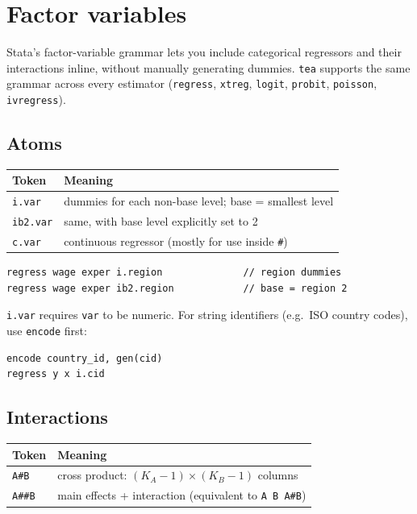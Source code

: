\documentclass[11pt,letterpaper]{article}
\begin{document}
\section{Factor variables}\label{sec:factor}

Stata's factor-variable grammar lets you include categorical regressors
and their interactions inline, without manually generating dummies.
\texttt{tea} supports the same grammar across every estimator
(\texttt{regress}, \texttt{xtreg}, \texttt{logit}, \texttt{probit},
\texttt{poisson}, \texttt{ivregress}).

\subsection{Atoms}

\begin{center}
\begin{tabular}{ll}
\toprule
Token & Meaning \\
\midrule
\texttt{i.var} & dummies for each non-base level; base = smallest level \\
\texttt{ib2.var} & same, with base level explicitly set to 2 \\
\texttt{c.var} & continuous regressor (mostly for use inside \texttt{\#}) \\
\bottomrule
\end{tabular}
\end{center}

\begin{lstlisting}
regress wage exper i.region              // region dummies
regress wage exper ib2.region            // base = region 2
\end{lstlisting}

\texttt{i.var} requires \texttt{var} to be numeric.  For string
identifiers (e.g.\ ISO country codes), use \texttt{encode} first:

\begin{lstlisting}
encode country_id, gen(cid)
regress y x i.cid
\end{lstlisting}

\subsection{Interactions}

\begin{center}
\begin{tabular}{ll}
\toprule
Token & Meaning \\
\midrule
\texttt{A\#B} & cross product: $(K_A - 1) \times (K_B - 1)$ columns \\
\texttt{A\#\#B} & main effects + interaction (equivalent to \texttt{A B A\#B}) \\
\bottomrule
\end{tabular}
\end{center}
\end{document}
